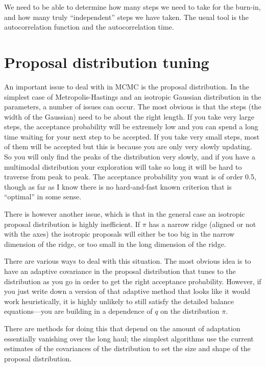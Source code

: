 We need to be able to determine how many steps we need to take for the
burn-in, and how many truly ``independent'' steps we have taken. The
usual tool is the autocorrelation function and the autocorrelation
time.

\section{Proposal distribution tuning}

An important issue to deal with in MCMC is the proposal
distribution. In the simplest case of Metropolis-Hastings and an
isotropic Gaussian distribution in the parameters, a number of issues
can occur. The most obvious is that the steps (the width of the
Gaussian) need to be about the right length. If you take very large
steps, the acceptance probability will be extremely low and you can
spend a long time waiting for your next step to be accepted. If you
take very small steps, most of them will be accepted but this is
because you are only very slowly updating. So you will only find the
peaks of the distribution very slowly, and if you have a multimodal
distribution your exploration will take so long it will be hard to
traverse from peak to peak. The acceptance probability you want is of
order 0.5, though as far as I know there is no hard-and-fast known
criterion that is ``optimal'' in some sense.

There is however another issue, which is that in the general case an
isotropic proposal distribution is highly inefficient. If $\pi$ has a
narrow ridge (aligned or not with the axes) the isotropic proposals
will either be too big in the narrow dimension of the ridge, or too
small in the long dimension of the ridge.

There are various ways to deal with this situation. The most obvious
idea is to have an adaptive covariance in the proposal distribution
that tunes to the distribution as you go in order to get the right
acceptance probability. However, if you just write down a version of
that adaptive method that looks like it would work heuristically, it
is highly unlikely to still satisfy the detailed balance
equations---you are building in a dependence of $q$ on the
distribution $\pi$.

There are methods for doing this that depend on the amount of
adaptation essentially vanishing over the long haul; the simplest
algorithms use the current estimates of the covariances of the
distribution to set the size and shape of the proposal distribution.

